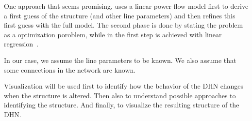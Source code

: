 \documentclass{scrartcl}
\begin{document}
    One approach that seems promising, uses a linear power flow model first to derive a first guess of the structure (and other line parameters) and then refines this first guess with the full model.
    The second phase is done by stating the problem as a optimization poroblem, while in the first step is achieved with linear regression~\cite{wang2024identification}.

    In our case, we assume the line parameters to be known.
    We also assume that some connections in the network are known.

    Visualization will be used first to identify how the behavior of the \ac{DHN} changes when the structure is altered.
    Then also to understand possible approaches to identifying the structure.
    And finally, to visualize the resulting structure of the \ac{DHN}.

    \printbibliography
\end{document}
